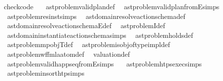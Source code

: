 \begin{isabellebody}
\isanewline
{}\isamarkupfalse%
\ check{\isacharunderscore}{\kern0pt}code\ {\isacharequal}{\kern0pt}\isanewline
\ \ ast{\isacharunderscore}{\kern0pt}problem{\isachardot}{\kern0pt}valid{\isacharunderscore}{\kern0pt}plan{}{\isacharunderscore}{\kern0pt}def\isanewline
\ \ ast{\isacharunderscore}{\kern0pt}problem{\isachardot}{\kern0pt}valid{\isacharunderscore}{\kern0pt}plan{\isacharunderscore}{\kern0pt}from{}E{\isachardot}{\kern0pt}simps\isanewline
\ \ ast{\isacharunderscore}{\kern0pt}problem{\isachardot}{\kern0pt}res{\isacharunderscore}{\kern0pt}inst{\isachardot}{\kern0pt}simps\isanewline
\ \ ast{\isacharunderscore}{\kern0pt}domain{\isachardot}{\kern0pt}resolve{\isacharunderscore}{\kern0pt}action{\isacharunderscore}{\kern0pt}schema{\isacharunderscore}{\kern0pt}def\isanewline
\ \ ast{\isacharunderscore}{\kern0pt}domain{\isachardot}{\kern0pt}resolve{\isacharunderscore}{\kern0pt}action{\isacharunderscore}{\kern0pt}schemaE{\isacharunderscore}{\kern0pt}def\isanewline
\ \ ast{\isacharunderscore}{\kern0pt}problem{\isachardot}{\kern0pt}I{\isacharunderscore}{\kern0pt}def\isanewline
\ \ ast{\isacharunderscore}{\kern0pt}domain{\isachardot}{\kern0pt}instantiate{\isacharunderscore}{\kern0pt}action{\isacharunderscore}{\kern0pt}schema{\isachardot}{\kern0pt}simps\isanewline
\ \ ast{\isacharunderscore}{\kern0pt}problem{\isachardot}{\kern0pt}holds{\isacharunderscore}{\kern0pt}def\isanewline
\ \ ast{\isacharunderscore}{\kern0pt}problem{\isachardot}{\kern0pt}mp{\isacharunderscore}{\kern0pt}objT{\isacharunderscore}{\kern0pt}def\isanewline
\ \ ast{\isacharunderscore}{\kern0pt}problem{\isachardot}{\kern0pt}is{\isacharunderscore}{\kern0pt}obj{\isacharunderscore}{\kern0pt}of{\isacharunderscore}{\kern0pt}type{\isacharunderscore}{\kern0pt}impl{\isacharunderscore}{\kern0pt}def\isanewline
\ \ ast{\isacharunderscore}{\kern0pt}problem{\isachardot}{\kern0pt}wf{\isacharunderscore}{\kern0pt}fmla{\isacharunderscore}{\kern0pt}atom{}{\isacharprime}{\kern0pt}{\isacharunderscore}{\kern0pt}def\isanewline
\ \ valuation{\isacharunderscore}{\kern0pt}def\isanewline
\ \ \isanewline
\ \ ast{\isacharunderscore}{\kern0pt}problem{\isachardot}{\kern0pt}valid{\isacharunderscore}{\kern0pt}happ{\isacharunderscore}{\kern0pt}seq{\isacharunderscore}{\kern0pt}fromE{\isachardot}{\kern0pt}simps\ \isanewline
\ \ ast{\isacharunderscore}{\kern0pt}problem{\isachardot}{\kern0pt}htps{\isacharunderscore}{\kern0pt}exec{\isachardot}{\kern0pt}simps\isanewline
\ \ ast{\isacharunderscore}{\kern0pt}problem{\isachardot}{\kern0pt}insort{\isacharunderscore}{\kern0pt}htp{\isachardot}{\kern0pt}simps\isanewline

\end{isabellebody}
